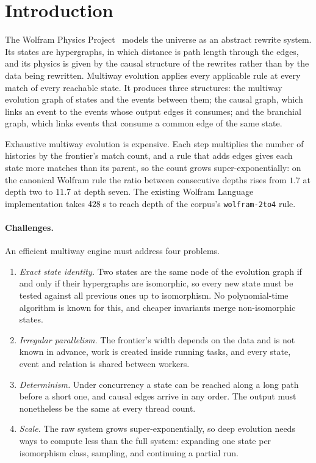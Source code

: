 \section{Introduction}
\label{sec:introduction}

The Wolfram Physics Project~\cite{wolfram2020project} models the universe as an abstract rewrite
system. Its states are hypergraphs, in which distance is path length through the edges, and its
physics is given by the causal structure of the rewrites rather than by the data being rewritten.
Multiway evolution applies every applicable rule at every match of every reachable state. It
produces three structures: the multiway evolution graph of states and the events between them; the
causal graph, which links an event to the events whose output edges it consumes; and the branchial
graph, which links events that consume a common edge of the same state.

Exhaustive multiway evolution is expensive. Each step multiplies the number of histories by the
frontier's match count, and a rule that adds edges gives each state more matches than its parent,
so the count grows super-exponentially: on the canonical Wolfram rule the ratio between consecutive
depths rises from $1.7$ at depth two to $11.7$ at depth seven. The existing Wolfram Language
implementation takes $428$\,s to reach depth \SpeedupHighDepth{} of the corpus's
\texttt{wolfram-2to4} rule.

\paragraph{Challenges.} An efficient multiway engine must address four problems.
\begin{enumerate}
    \item \emph{Exact state identity.} Two states are the same node of the evolution graph if and
    only if their hypergraphs are isomorphic, so every new state must be tested against all
    previous ones up to isomorphism. No polynomial-time algorithm is known for this, and cheaper
    invariants merge non-isomorphic states.
    \item \emph{Irregular parallelism.} The frontier's width depends on the data and is not known
    in advance, work is created inside running tasks, and every state, event and relation is
    shared between workers.
    \item \emph{Determinism.} Under concurrency a state can be reached along a long path before a
    short one, and causal edges arrive in any order. The output must nonetheless be the same at
    every thread count.
    \item \emph{Scale.} The raw system grows super-exponentially, so deep evolution needs ways to
    compute less than the full system: expanding one state per isomorphism class, sampling, and
    continuing a partial run.
\end{enumerate}

